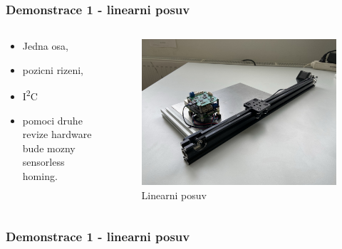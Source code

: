\documentclass[%
  12pt,       				%
	t,                  %
	aspectratio=1610,   %
	unicode,						%
]{beamer}				    	%
\begin{document}
\begin{frame}
	\frametitle{Demonstrace 1 - linearni posuv}
	\begin{columns}[T] 								%
		\begin{column}{0.4\textwidth}
			\begin{itemize}
				\item Jedna osa,
				\item pozicni rizeni,
				\item I\textsuperscript{2}C
				\item pomoci druhe revize hardware bude mozny sensorless homing.
			\end{itemize}
		\end{column}
		\begin{column}{0.6\textwidth}		%
			\begin{figure}%
				\centering
				\includegraphics[width=0.8\columnwidth]{../Thesis/obrazky/rail}
				\caption{Linearni posuv}%
				\label{fig:sm4_block}
			\end{figure}
		\end{column}
	\end{columns}
\end{frame}

\begin{frame}
	\frametitle{Demonstrace 1 - linearni posuv}
\end{frame}
\end{document}
